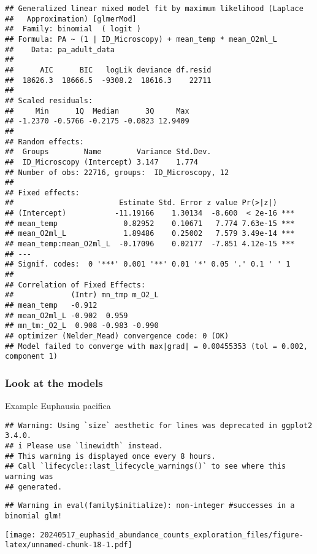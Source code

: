 \documentclass[
]{article}
\begin{document}
\begin{verbatim}
## Generalized linear mixed model fit by maximum likelihood (Laplace
##   Approximation) [glmerMod]
##  Family: binomial  ( logit )
## Formula: PA ~ (1 | ID_Microscopy) + mean_temp * mean_O2ml_L
##    Data: pa_adult_data
## 
##      AIC      BIC   logLik deviance df.resid 
##  18626.3  18666.5  -9308.2  18616.3    22711 
## 
## Scaled residuals: 
##     Min      1Q  Median      3Q     Max 
## -1.2370 -0.5766 -0.2175 -0.0823 12.9409 
## 
## Random effects:
##  Groups        Name        Variance Std.Dev.
##  ID_Microscopy (Intercept) 3.147    1.774   
## Number of obs: 22716, groups:  ID_Microscopy, 12
## 
## Fixed effects:
##                        Estimate Std. Error z value Pr(>|z|)    
## (Intercept)           -11.19166    1.30134  -8.600  < 2e-16 ***
## mean_temp               0.82952    0.10671   7.774 7.63e-15 ***
## mean_O2ml_L             1.89486    0.25002   7.579 3.49e-14 ***
## mean_temp:mean_O2ml_L  -0.17096    0.02177  -7.851 4.12e-15 ***
## ---
## Signif. codes:  0 '***' 0.001 '**' 0.01 '*' 0.05 '.' 0.1 ' ' 1
## 
## Correlation of Fixed Effects:
##             (Intr) mn_tmp m_O2_L
## mean_temp   -0.912              
## mean_O2ml_L -0.902  0.959       
## mn_tm:_O2_L  0.908 -0.983 -0.990
## optimizer (Nelder_Mead) convergence code: 0 (OK)
## Model failed to converge with max|grad| = 0.00455353 (tol = 0.002, component 1)
\end{verbatim}

\hypertarget{look-at-the-models}{%
\subsubsection{Look at the models}\label{look-at-the-models}}

Example Euphausia pacifica

\begin{verbatim}
## Warning: Using `size` aesthetic for lines was deprecated in ggplot2 3.4.0.
## i Please use `linewidth` instead.
## This warning is displayed once every 8 hours.
## Call `lifecycle::last_lifecycle_warnings()` to see where this warning was
## generated.
\end{verbatim}

\begin{verbatim}
## Warning in eval(family$initialize): non-integer #successes in a binomial glm!
\end{verbatim}

\texttt{[image: 20240517\_euphasid\_abundance\_counts\_exploration\_files/figure-latex/unnamed-chunk-18-1.pdf]}
\end{document}
